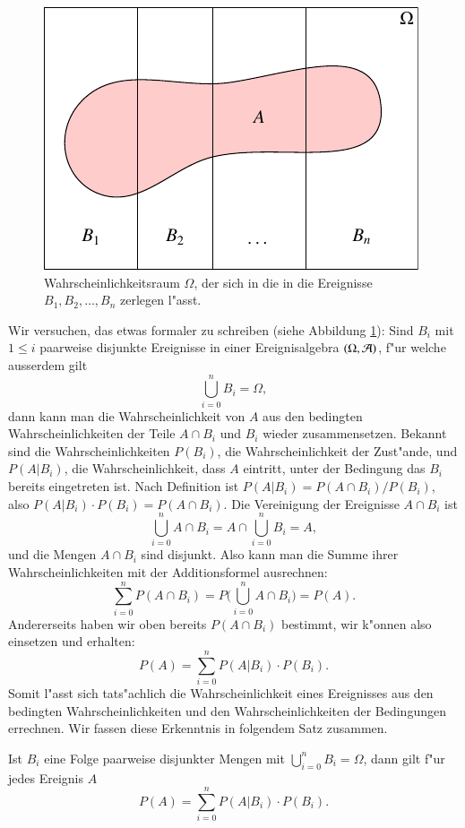 \begin{figure}
\begin{center}
\includegraphics{images/total-1.pdf}
\end{center}
\caption{Wahrscheinlichkeitsraum $\Omega$, der sich in die in die
Ereignisse $B_1,B_2,\dots,B_n$ zerlegen l"asst.\label{zerlegung}}
\end{figure}
Wir versuchen, das etwas formaler zu schreiben
(siehe Abbildung \ref{zerlegung}):
Sind $B_i$ mit $1\le i$ paarweise
disjunkte Ereignisse
in einer Ereignisalgebra $(\Omega,{\cal A})$, f"ur welche ausserdem
gilt
\[
\bigcup_{i=0}^{n}B_i = \Omega,
\]
dann kann man die Wahrscheinlichkeit von $A$ aus den bedingten
Wahrscheinlichkeiten der Teile $A\cap B_i$ und $B_i$ wieder zusammensetzen.
Bekannt sind die Wahrscheinlichkeiten
$P(B_i)$, die Wahrscheinlichkeit der Zust"ande, und
$P(A|B_i)$, die Wahrscheinlichkeit, dass $A$ eintritt, unter der Bedingung
das $B_i$ bereits eingetreten ist.
Nach Definition ist $P(A|B_i)=P(A\cap B_i)/P(B_i)$, also
$P(A|B_i)\cdot P(B_i) = P(A\cap B_i)$.
Die Vereinigung der Ereignisse $A\cap B_i$ ist
\[
\bigcup_{i=0}^{n} A\cap B_i=A\cap\bigcup_{i=0}^{n}B_i=A,
\]
und die Mengen $A\cap B_i$ sind disjunkt.
Also kann man die Summe ihrer
Wahrscheinlichkeiten mit der Additionsformel ausrechnen:
\[
\sum_{i=0}^{n}P(A\cap B_i)=P\biggl(\bigcup_{i=0}^{n}A\cap B_i\biggr)=P(A).
\]
Andererseits
haben wir oben bereits $P(A\cap B_i)$ bestimmt, wir k"onnen
also einsetzen und erhalten:
\[
P(A)=\sum_{i=0}^{n}P(A|B_i)\cdot P(B_i).
\]
Somit l"asst sich tats"achlich die Wahrscheinlichkeit eines Ereignisses
aus den bedingten Wahrscheinlichkeiten und den Wahrscheinlichkeiten
der Bedingungen errechnen.
Wir fassen diese Erkenntnis in folgendem Satz zusammen.
\begin{satz}
Ist $B_i$ eine Folge paarweise disjunkter Mengen mit $\bigcup_{i=0}^{n}B_i=\Omega$, dann gilt f"ur jedes Ereignis $A$
\[
P(A)=\sum_{i=0}^{n}P(A|B_i)\cdot P(B_i).
\]
\end{satz}
